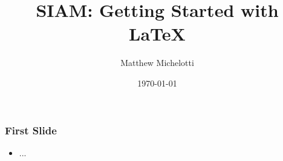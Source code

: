\documentclass{beamer}
\title{SIAM: Getting Started with \LaTeX}
\author{Matthew Michelotti}
\date{\today}
\begin{document}
\frame{\titlepage}

\frame
{
  \frametitle{First Slide}

  \begin{itemize}
  \item ...
  \end{itemize}
}
\end{document}
